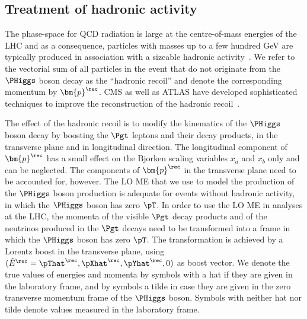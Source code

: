 \subsection{Treatment of hadronic activity}
\label{sec:mem_hadRecoil}

The phase-space for QCD radiation is large at the centre-of-mass
energies of the LHC
and as a consequence, particles with masses up to a few hundred GeV 
are typically produced in association with a sizeable hadronic activity~\cite{Alwall:2010cq}.
We refer to the vectorial sum of all particles in the event that do not originate from the $\PHiggs$ boson decay
as the ``hadronic recoil'' and denote the corresponding momentum by $\bm{p}^{\rec}$.
CMS as well as ATLAS have developed sophisticated techniques to improve the reconstruction 
of the hadronic recoil~\cite{CMS-JME-13-003,ATLAS-CONF-2014-019}.

The effect of the hadronic recoil is to modify the kinematics of the $\PHiggs$ boson decay
by boosting the $\Pgt$ leptons and their decay products,
in the transverse plane and in longitudinal direction.
The longitudinal component of $\bm{p}^{\rec}$ has a small effect on 
the Bjorken scaling variables $x_{a}$ and $x_{b}$ only and can be neglected.
The components of $\bm{p}^{\rec}$ in the transverse plane need to be accounted for, however.
The LO ME that we use to model the production of the $\PHiggs$ boson production 
is adequate for events without hadronic activity,
in which the $\PHiggs$ boson has zero $\pT$.
In order to use the LO ME in analyses at the LHC,
the momenta of the visible $\Pgt$ decay products and of the neutrinos produced in the $\Pgt$ decays
need to be transformed into a frame in which the $\PHiggs$ boson has zero $\pT$.
The transformation is achieved by a Lorentz boost in the transverse plane,
using $(\hat{E}^{\rec} = \pThat^{\rec}, \pXhat^{\rec}, \pYhat^{\rec}, 0)$ as boost
vector.
We denote the true values of energies and momenta by symbols with a
hat if they are given in the laboratory frame, and by symbols a tilde in case they are given in the zero transverse momentum frame of the $\PHiggs$ boson.
Symbols with neither hat nor tilde denote values measured in the
laboratory frame.

